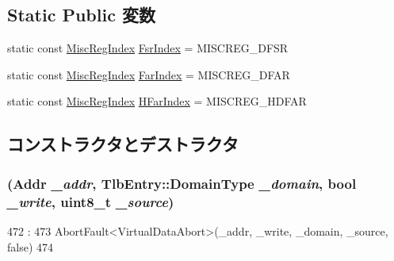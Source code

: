 \subsection*{Static Public 変数}
\begin{DoxyCompactItemize}
\item 
static const \hyperlink{namespaceArmISA_a1e522017e015d4c7efd6b2360143aa67}{MiscRegIndex} \hyperlink{classArmISA_1_1VirtualDataAbort_a0fc945049ae4ebc86b2c2765b65ab5c8}{FsrIndex} = MISCREG\_\-DFSR
\item 
static const \hyperlink{namespaceArmISA_a1e522017e015d4c7efd6b2360143aa67}{MiscRegIndex} \hyperlink{classArmISA_1_1VirtualDataAbort_a3c751f200a61047c7edace6f38db43aa}{FarIndex} = MISCREG\_\-DFAR
\item 
static const \hyperlink{namespaceArmISA_a1e522017e015d4c7efd6b2360143aa67}{MiscRegIndex} \hyperlink{classArmISA_1_1VirtualDataAbort_adf1eccd205afd5770084542cc2295d6c}{HFarIndex} = MISCREG\_\-HDFAR
\end{DoxyCompactItemize}


\subsection{コンストラクタとデストラクタ}
\hypertarget{classArmISA_1_1VirtualDataAbort_a144ebf1c82b0b283c23af51e73cf00bd}{
\subsubsection[{VirtualDataAbort}]{ ({\bf Addr} {\em \_\-addr}, \/  {\bf TlbEntry::DomainType} {\em \_\-domain}, \/  bool {\em \_\-write}, \/  uint8\_\-t {\em \_\-source})}}
\label{classArmISA_1_1VirtualDataAbort_a144ebf1c82b0b283c23af51e73cf00bd}



\begin{DoxyCode}
472                                       :
473         AbortFault<VirtualDataAbort>(_addr, _write, _domain, _source, false)
474     {}

\end{DoxyCode}


